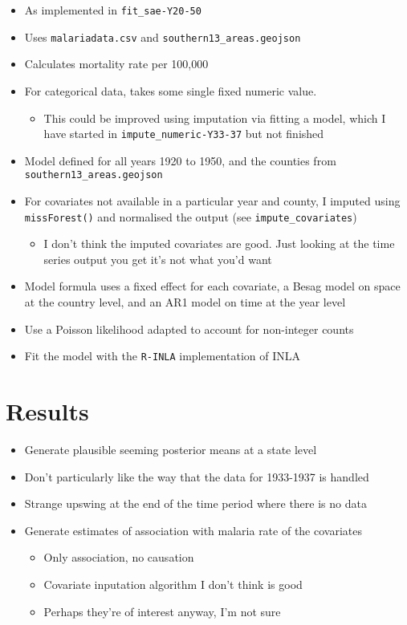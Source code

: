 \documentclass[
]{article}
\providecommand{\tightlist}{%
  \setlength{\itemsep}{0pt}\setlength{\parskip}{0pt}}
\begin{document}
\begin{itemize}
\tightlist
\item
  As implemented in \texttt{fit\_sae-Y20-50}
\item
  Uses \texttt{malariadata.csv} and \texttt{southern13\_areas.geojson}
\item
  Calculates mortality rate per 100,000
\item
  For categorical data, takes some single fixed numeric value.

  \begin{itemize}
  \tightlist
  \item
    This could be improved using imputation via fitting a model, which I
    have started in \texttt{impute\_numeric-Y33-37} but not finished
  \end{itemize}
\item
  Model defined for all years 1920 to 1950, and the counties from
  \texttt{southern13\_areas.geojson}
\item
  For covariates not available in a particular year and county, I
  imputed using \texttt{missForest()} and normalised the output (see
  \texttt{impute\_covariates})

  \begin{itemize}
  \tightlist
  \item
    I don't think the imputed covariates are good. Just looking at the
    time series output you get it's not what you'd want
  \end{itemize}
\item
  Model formula uses a fixed effect for each covariate, a Besag model on
  space at the country level, and an AR1 model on time at the year level
\item
  Use a Poisson likelihood adapted to account for non-integer counts
\item
  Fit the model with the \texttt{R-INLA} implementation of INLA
\end{itemize}

\hypertarget{results}{%
\section{Results}\label{results}}

\begin{itemize}
\tightlist
\item
  Generate plausible seeming posterior means at a state level
\item
  Don't particularly like the way that the data for 1933-1937 is handled
\item
  Strange upswing at the end of the time period where there is no data
\item
  Generate estimates of association with malaria rate of the covariates

  \begin{itemize}
  \tightlist
  \item
    Only association, no causation
  \item
    Covariate inputation algorithm I don't think is good
  \item
    Perhaps they're of interest anyway, I'm not sure
  \end{itemize}
\end{itemize}
\end{document}
